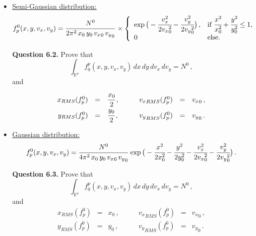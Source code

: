 \documentclass[10pt]{article}
\newcommand{\R}{{\mathbb R}}
\begin{document}
\begin{itemize}
\item \underline{Semi-Gaussian distribution:}
\begin{equation}
f_{p}^{0}(x,y,v_{x},v_{y}) = \cfrac{N^{0}}{2\pi^{2}\,x_{0}\,y_{0}\,{v_{x}}_{0}\,{v_{y}}_{0}}\, \times \left\{
\begin{array}{ll}
\exp\big(-\cfrac{v_{x}^{2}}{2{v_{x}}_{0}^{2}}-\cfrac{v_{y}^{2}}{2{v_{y}}_{0}^{2}}\big) \, , & \textnormal{if $\cfrac{x^{2}}{x_{0}^{2}}+\cfrac{y^{2}}{y_{0}^{2}} \leq 1$,} \\
0 & \textnormal{else.}
\end{array}
\right.
\end{equation}

\begin{leftbar}
\textbf{Question 6.2.} Prove that
\begin{equation}
\int_{\R^{4}} f_{0}^{p}(x,y,v_{x},v_{y}) \, dx \, dy \, dv_{x} \, dv_{y} = N^{0} \, ,
\end{equation}
and
\begin{equation}
\begin{array}{rclrcl}
x_{RMS}(f_{p}^{0}) &=& \cfrac{x_{0}}{2}\, , \qquad & {v_{x}}_{RMS}(f_{p}^{0}) &=& {v_{x}}_{0} \, , \\
y_{RMS}(f_{p}^{0}) &=& \cfrac{y_{0}}{2}\, , \qquad & {v_{y}}_{RMS}(f_{p}^{0}) &=& {v_{y}}_{0} \, .
\end{array}
\end{equation}
\end{leftbar}




\item \underline{Gaussian distribution:}
\begin{equation}
f_{p}^{0}(x,y,v_{x},v_{y}) = \cfrac{N^{0}}{4\pi^{2}\,x_{0}\,y_{0}\,{v_{x}}_{0}\,{v_{y}}_{0}} \, \exp\big(-\cfrac{x^{2}}{2x_{0}^{2}} - \cfrac{y^{2}}{2y_{0}^{2}} - \cfrac{v_{x}^{2}}{2{v_{x}}_{0}^{2}} - \cfrac{v_{y}^{2}}{2{v_{y}}_{0}^{2}} \big) \, .
\end{equation}


\begin{leftbar}
\textbf{Question 6.3.} Prove that 
\begin{equation}
\int_{\R^{4}} f_{0}^{p}(x,y,v_{x},v_{y}) \, dx \, dy \, dv_{x} \, dv_{y} = N^{0} \, ,
\end{equation}
and
\begin{equation}
\begin{array}{rclrcl}
x_{RMS}(f_{p}^{0}) &=& x_{0} \, , \qquad & {v_{x}}_{RMS}(f_{p}^{0}) &=& {v_{x}}_{0} \, , \\
y_{RMS}(f_{p}^{0}) &=& y_{0} \, , \qquad & {v_{y}}_{RMS}(f_{p}^{0}) &=& {v_{y}}_{0} \, .
\end{array}
\end{equation}
\end{leftbar}

\end{itemize}
\end{document}
